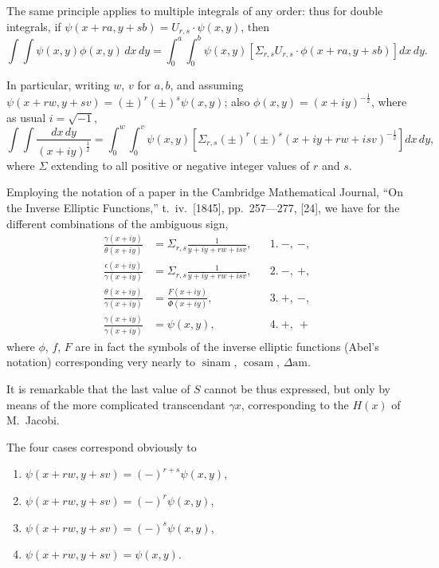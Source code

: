 \documentclass[11pt,a4paper]{article}
\theoremstyle{plain}
\begin{document}
The same principle applies to multiple integrals of any order: thus for double integrals, if $\psi(x+ra, y+sb) = U_{r,s} \cdot \psi(x,y)$, then
\begin{equation}\int\!\!\int \psi(x,y) \phi(x,y) \, dx \, dy = \int_0^a\!\!\int_0^b \psi(x,y) \left[\Sigma_{r,s} U_{r,s} \cdot \phi(x+ra, y+sb)\right] dx \, dy.\tag{B}\end{equation}

In particular, writing $w$, $v$ for $a,b$, and assuming $\psi(x+rw, y+sv) = (\pm)^r (\pm)^s \psi(x,y)$; also $\phi(x,y) = (x+iy)^{-\frac{1}{2}}$, where as usual $i=\sqrt{-1}$,
\[\int\!\!\int \frac{dx \, dy}{(x+iy)^{\frac{1}{2}}} = \int_0^w\!\!\int_0^v \psi(x,y) \left[\Sigma_{r,s} (\pm)^r (\pm)^s (x+iy+rw+isv)^{-\frac{1}{2}}\right] dx \, dy,\]
where $\Sigma$ extending to all positive or negative integer values of $r$ and $s$.

Employing the notation of a paper in the Cambridge Mathematical Journal, ``On the Inverse Elliptic Functions,'' t.\ iv.\ [1845], pp.\ 257---277, [24], we have for the different combinations of the ambiguous sign,
\begin{align*}
\frac{\gamma(x+iy)}{\theta(x+iy)} &= \Sigma_{r,s} \frac{1}{y+iy+rw+isv}, && 1.\ -,\ -,\\
\frac{\epsilon(x+iy)}{\gamma(x+iy)} &= \Sigma_{r,s} \frac{1}{y+iy+rw+isv}, && 2.\ -,\ +,\\
\frac{\theta(x+iy)}{\gamma(x+iy)} &= \frac{F(x+iy)}{\Phi(x+iy)}, && 3.\ +,\ -,\\
\frac{\gamma(x+iy)}{\gamma(x+iy)} &= \psi(x,y), && 4.\ +,\ +
\end{align*}
where $\phi$, $f$, $F$ are in fact the symbols of the inverse elliptic functions (Abel's notation) corresponding very nearly to $\sin \text{am}$, $\cos \text{am}$, $\Delta \text{am}$.

It is remarkable that the last value of $S$ cannot be thus expressed, but only by means of the more complicated transcendant $\gamma x$, corresponding to the $H(x)$ of M.\ Jacobi.

The four cases correspond obviously to
\begin{enumerate}[label=\arabic*.]
\item $\psi(x+rw, y+sv) = (-)^{r+s} \psi(x,y)$,
\item $\psi(x+rw, y+sv) = (-)^r \psi(x,y)$,
\item $\psi(x+rw, y+sv) = (-)^s \psi(x,y)$,
\item $\psi(x+rw, y+sv) = \psi(x,y)$.
\end{enumerate}
\end{document}
